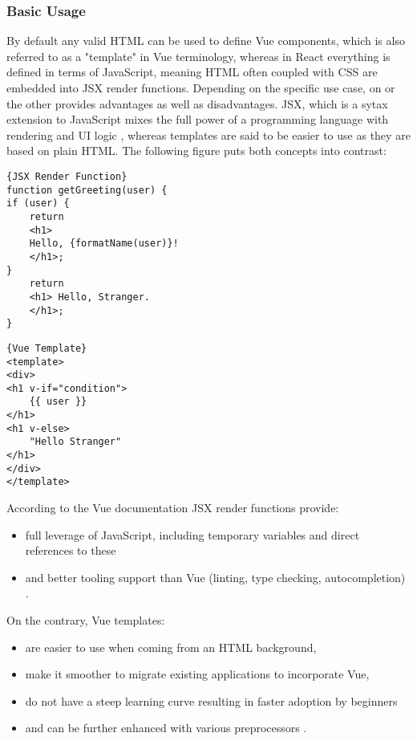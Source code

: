 \subsubsection{Basic Usage} \label{basic-usage}
By default any valid HTML can be used to define Vue components, which is also referred to as a "template" in Vue terminology, whereas in React everything is defined in terms of JavaScript, meaning HTML often coupled with CSS are embedded into JSX render functions. Depending on the specific use case, on or the other provides advantages as well as disadvantages. JSX, which is a sytax extension to JavaScript \cite{ReactJSX:online} mixes the full power of a programming language with rendering and UI logic \cite{ComparisonVue:online,ReactJSX:online}, whereas templates are said to be easier to use as they are based on plain HTML. The following figure puts both concepts into contrast:

\noindent\begin{minipage}{.45\textwidth}
\begin{lstlisting}[caption=JSX Render Function, captionpos=b, style=htmlcssjs]{JSX Render Function}
function getGreeting(user) {
if (user) {
    return 
    <h1>
    Hello, {formatName(user)}!
    </h1>;
}
    return 
    <h1> Hello, Stranger.
    </h1>;
}
\end{lstlisting}
\end{minipage}\hfill
\begin{minipage}{.45\textwidth}
\begin{lstlisting}[caption=Vue Template, captionpos=b, style=htmlcssjs]{Vue Template}
<template>
<div>
<h1 v-if="condition"> 
    {{ user }} 
</h1>
<h1 v-else> 
    "Hello Stranger"
</h1>
</div>
</template>
\end{lstlisting}
\end{minipage}

According to the Vue documentation JSX render functions provide:
\begin{itemize}
    \item full leverage of JavaScript, including temporary variables and direct references to these
    \item and better tooling support than Vue (linting, type checking, autocompletion) \cite{ComparisonVue:online}.
\end{itemize}

On the contrary, Vue templates: 
\begin{itemize}
    \item are easier to use when coming from an HTML background,  
    \item make it smoother to migrate existing applications to incorporate Vue, 
    \item do not have a steep learning curve resulting in faster adoption by beginners
    \item and can be further enhanced with various preprocessors \cite{ComparisonVue:online}.
\end{itemize}

